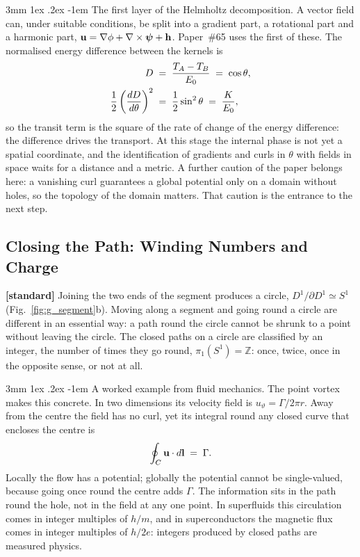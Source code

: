 \documentclass[%
 reprint, amsmath,amssymb, aps, prb, ]{revtex4-2}
\makeatletter
\numberwithin{equation}{section}
\renewcommand\paragraph{%
  \@startsection{paragraph}{4}{\z@}%
    {3mm \@plus 1ex \@minus .2ex}%
    {-1em}%
    {\normalfont\normalsize\itshape}}
\newcommand{\iphase}{\theta}
\makeatother
\begin{document}
\paragraph{The first layer of the Helmholtz decomposition.} A vector field can, under suitable conditions, be split into a gradient part, a rotational part and a harmonic part, $\vb{u} = \nabla\phi + \nabla\times\bm{\psi} + \vb{h}$. Paper~\#65 uses the first of these. The normalised energy difference between the kernels is
\begin{align}
D &\;=\; \frac{T_A - T_B}{E_0} \;=\; \cos\iphase ,
\notag\\
\frac12\left(\frac{dD}{d\iphase}\right)^{2} &\;=\; \frac12\sin^{2}\iphase \;=\; \frac{K}{E_0},
\label{eq:g_gradient}
\end{align}
so the transit term is the square of the rate of change of the energy difference: the difference drives the transport. At this stage the internal phase is not yet a spatial coordinate, and the identification of gradients and curls in $\iphase$ with fields in space waits for a distance and a metric. A further caution of the paper belongs here: a vanishing curl guarantees a global potential only on a domain without holes, so the topology of the domain matters. That caution is the entrance to the next step.

\subsection{Closing the Path: Winding Numbers and Charge}
\label{subsec:g_winding}

\textbf{[standard]} Joining the two ends of the segment produces a circle, $D^{1}/\partial D^{1} \simeq S^{1}$ (Fig.~\ref{fig:g_segment}b). Moving along a segment and going round a circle are different in an essential way: a path round the circle cannot be shrunk to a point without leaving the circle. The closed paths on a circle are classified by an integer, the number of times they go round, $\pi_1(S^{1}) = \mathbb{Z}$: once, twice, once in the opposite sense, or not at all.

\paragraph{A worked example from fluid mechanics.} The point vortex makes this concrete. In two dimensions its velocity field is $u_\vartheta = \Gamma/2\pi r$. Away from the centre the field has no curl, yet its integral round any closed curve that encloses the centre is
\begin{equation}
\oint_C \vb{u}\cdot d\vb{l} \;=\; \Gamma .
\label{eq:g_vortex}
\end{equation}
Locally the flow has a potential; globally the potential cannot be single-valued, because going once round the centre adds $\Gamma$. The information sits in the path round the hole, not in the field at any one point. In superfluids this circulation comes in integer multiples of $h/m$, and in superconductors the magnetic flux comes in integer multiples of $h/2e$: integers produced by closed paths are measured physics.
\end{document}
